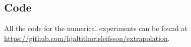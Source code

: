 \begin{appendices}
\chapter{Code}

All the code for the numerical experiments can be found at\\
 \url{https://github.com/hjaltithorisleifsson/extrapolation}.

\end{appendices}